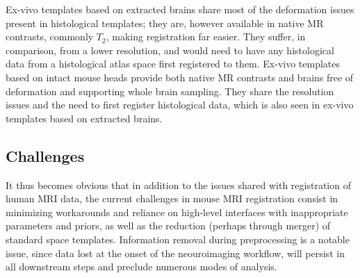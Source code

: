Ex-vivo templates based on extracted brains share most of the deformation issues present in histological templates;
they are, however available in native MR contrasts, commonly $T_2$, making registration far easier.
They suffer, in comparison, from a lower resolution, and would need to have any histological data from a histological atlas space first registered to them.
Ex-vivo templates based on intact mouse heads provide both native MR contrasts and brains free of deformation and supporting whole brain sampling.
They share the resolution issues and the need to first register histological data, which is also seen in ex-vivo templates based on extracted brains.

\subsection{Challenges}
It thus becomes obvious that in addition to the issues shared with registration of human MRI data, the current challenges in mouse MRI registration consist in minimizing workarounds and reliance on high-level interfaces with inappropriate parameters and priors, as well as the reduction (perhaps through merger) of standard space templates.
Information removal during preprocessing is a notable issue, since data lost at the onset of the neouroimaging workflow, will persist in all downstream steps and preclude numerous modes of analysis.

